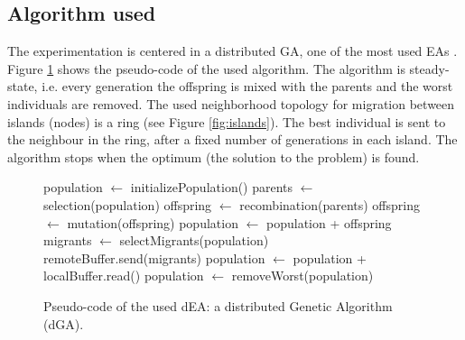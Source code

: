 \documentclass[final,1p,times]{elsarticle}
\begin{document}
\subsection{Algorithm used}
The experimentation is centered in a distributed GA, one of the most used EAs \cite{GeneticAlgorithmsEiben03}. Figure \ref{fig:EA} shows the pseudo-code of the used algorithm. %
The algorithm is steady-state, i.e. every generation the offspring is mixed with the parents and the worst individuals are removed. The used neighborhood topology for migration between islands (nodes) is a ring (see Figure \ref{fig:islands}). The best individual is sent to the neighbour in the ring, after a fixed number of generations in each island. The algorithm stops when the optimum (the solution to the problem) is found.  %



\begin{figure}[htb]

\begin{algorithmic}
\STATE population $\gets$ initializePopulation()
    \STATE parents $\gets$ selection(population)
    \STATE offspring $\gets$ recombination(parents)
    \STATE offspring $\gets$ mutation(offspring)
    \STATE population $\gets$ population + offspring
      \STATE migrants $\gets$ selectMigrants(population)
      \STATE remoteBuffer.send(migrants)
    \ENDIF
      \STATE population $\gets$ population + localBuffer.read()
    \ENDIF
    \STATE population $\gets$ removeWorst(population)
\ENDWHILE

\end{algorithmic}
\caption{Pseudo-code of the used dEA: a distributed Genetic Algorithm (dGA).}
\label{fig:EA}
\end{figure}
\end{document}
